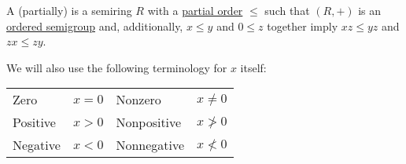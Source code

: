 \begin{definition}\label{def:ordered_semiring}
  A (partially)  is a semiring \( R \) with a \hyperref[def:partially_ordered_set]{partial order} \( \leq \) such that \( (R, +) \) is an \hyperref[def:ordered_semigroup]{ordered semigroup} and, additionally, \( x \leq y \) and \( 0 \leq z \) together imply \( xz \leq yz \) and \( zx \leq zy \).

  We will also use the following terminology for \( x \) itself:
  \begin{center}
    \begin{tabular}{l | l || l | l}
      Zero        & \( x = 0 \) & Nonzero     & \( x \neq 0 \) \\
      Positive    & \( x > 0 \) & Nonpositive & \( x \not> 0 \) \\
      Negative    & \( x < 0 \) & Nonnegative & \( x \not< 0 \)
    \end{tabular}
  \end{center}
\end{definition}

